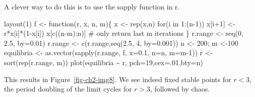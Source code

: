 \documentclass[
  a4paper,
  DIV=11,
  numbers=noendperiod,
  oneside]{scrreprt}
\newenvironment{Shaded}{\begin{snugshade}}{\end{snugshade}}
\newcommand{\AttributeTok}[1]{\textcolor[rgb]{0.40,0.45,0.13}{#1}}
\newcommand{\CommentTok}[1]{\textcolor[rgb]{0.37,0.37,0.37}{#1}}
\newcommand{\ControlFlowTok}[1]{\textcolor[rgb]{0.00,0.23,0.31}{#1}}
\newcommand{\DecValTok}[1]{\textcolor[rgb]{0.68,0.00,0.00}{#1}}
\newcommand{\FloatTok}[1]{\textcolor[rgb]{0.68,0.00,0.00}{#1}}
\newcommand{\FunctionTok}[1]{\textcolor[rgb]{0.28,0.35,0.67}{#1}}
\newcommand{\NormalTok}[1]{\textcolor[rgb]{0.00,0.23,0.31}{#1}}
\newcommand{\OtherTok}[1]{\textcolor[rgb]{0.00,0.23,0.31}{#1}}
\newcommand{\SpecialCharTok}[1]{\textcolor[rgb]{0.37,0.37,0.37}{#1}}
\newcommand{\StringTok}[1]{\textcolor[rgb]{0.13,0.47,0.30}{#1}}
\begin{document}
A clever way to do this is to use the sapply function in r.

\begin{Shaded}
\begin{Highlighting}[]
\FunctionTok{layout}\NormalTok{(}\DecValTok{1}\NormalTok{)}
\NormalTok{f }\OtherTok{\textless{}{-}} \ControlFlowTok{function}\NormalTok{(r, x, n, m)\{}
\NormalTok{  x }\OtherTok{\textless{}{-}} \FunctionTok{rep}\NormalTok{(x,n)}
  \ControlFlowTok{for}\NormalTok{(i }\ControlFlowTok{in} \DecValTok{1}\SpecialCharTok{:}\NormalTok{(n}\DecValTok{{-}1}\NormalTok{)) x[i}\SpecialCharTok{+}\DecValTok{1}\NormalTok{] }\OtherTok{\textless{}{-}}\NormalTok{ r}\SpecialCharTok{*}\NormalTok{x[i]}\SpecialCharTok{*}\NormalTok{(}\DecValTok{1}\SpecialCharTok{{-}}\NormalTok{x[i])}
\NormalTok{  x[}\FunctionTok{c}\NormalTok{((n}\SpecialCharTok{{-}}\NormalTok{m)}\SpecialCharTok{:}\NormalTok{n)] }\CommentTok{\# only return last m iterations}
\NormalTok{\}}
\NormalTok{r.range }\OtherTok{\textless{}{-}} \FunctionTok{seq}\NormalTok{(}\DecValTok{0}\NormalTok{, }\FloatTok{2.5}\NormalTok{, }\AttributeTok{by=}\FloatTok{0.01}\NormalTok{) }
\NormalTok{r.range }\OtherTok{\textless{}{-}} \FunctionTok{c}\NormalTok{(r.range,}\FunctionTok{seq}\NormalTok{(}\FloatTok{2.5}\NormalTok{, }\DecValTok{4}\NormalTok{, }\AttributeTok{by=}\FloatTok{0.001}\NormalTok{)) }
\NormalTok{n }\OtherTok{\textless{}{-}} \DecValTok{200}\NormalTok{; m }\OtherTok{\textless{}{-}}\DecValTok{100} 
\NormalTok{equilibria }\OtherTok{\textless{}{-}} \FunctionTok{as.vector}\NormalTok{(}\FunctionTok{sapply}\NormalTok{(r.range, f,  }\AttributeTok{x=}\FloatTok{0.1}\NormalTok{, }\AttributeTok{n=}\NormalTok{n, }\AttributeTok{m=}\NormalTok{m}\DecValTok{{-}1}\NormalTok{))}
\NormalTok{r }\OtherTok{\textless{}{-}} \FunctionTok{sort}\NormalTok{(}\FunctionTok{rep}\NormalTok{(r.range, m))}
\FunctionTok{plot}\NormalTok{(equilibria }\SpecialCharTok{\textasciitilde{}}\NormalTok{ r, }\AttributeTok{pch=}\DecValTok{19}\NormalTok{,}\AttributeTok{cex=}\NormalTok{.}\DecValTok{01}\NormalTok{,}\AttributeTok{bty=}\StringTok{\textquotesingle{}n\textquotesingle{}}\NormalTok{)}
\end{Highlighting}
\end{Shaded}

This results in Figure~\ref{fig-ch2-img8}. We see indeed fixed stable
points for \(r < 3\), the period doubling of the limit cycles for
\(r > 3\), followed by chaos.
\end{document}
